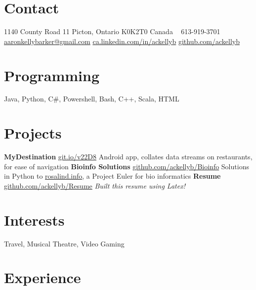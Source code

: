 \documentclass[]{friggeri-cv} %
\begin{document}



\begin{aside} %
	\section{Contact}
	1140 County Road 11 
	Picton, Ontario
	K0K2T0 Canada
	~
	613-919-3701
	~
	\href{mailto:aaron.kelly.barker@gmail.com}{aaronkellybarker@gmail.com}
	\href{ca.linkedin.com/in/ackellyb/}{ca.linkedin.com/in/ackellyb}
	\href{https://github.com/ackellyb}{github.com/ackellyb}
	~
	\section{Programming}
	Java, Python, C\#,
	Powershell, Bash, 
	C++, Scala, HTML
	~
	\section{Projects}
	\textbf{MyDestination}
	\href{https://github.com/Nauscar/myDestination}{git.io/v22D8}
	Android app, collates data streams on restaurants, for ease of navigation
	\textbf{Bioinfo Solutions}
	\href{https://github.com/ackellyb/Bioinfo}{github.com/ackellyb/Bioinfo}
	Solutions in Python to \href{http://rosalind.info/}{rosalind.info}, a Project Euler for bio informatics
	\textbf{Resume}
	\href{https://github.com/ackellyb/Resume}{github.com/ackellyb/Resume}
	\emph{Built this resume using Latex!} 
	~
	\section{Interests}
	Travel, Musical Theatre, 
	Video Gaming
\end{aside}


\section{Experience}
\end{document}
